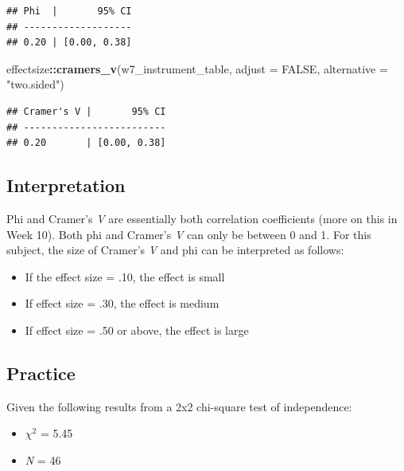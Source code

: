 \documentclass[
]{book}
\newenvironment{Shaded}{\begin{snugshade}}{\end{snugshade}}
\newcommand{\AttributeTok}[1]{\textcolor[rgb]{0.13,0.29,0.53}{#1}}
\newcommand{\ConstantTok}[1]{\textcolor[rgb]{0.56,0.35,0.01}{#1}}
\newcommand{\FunctionTok}[1]{\textcolor[rgb]{0.13,0.29,0.53}{\textbf{#1}}}
\newcommand{\NormalTok}[1]{#1}
\newcommand{\SpecialCharTok}[1]{\textcolor[rgb]{0.81,0.36,0.00}{\textbf{#1}}}
\newcommand{\StringTok}[1]{\textcolor[rgb]{0.31,0.60,0.02}{#1}}
\providecommand{\tightlist}{%
  \setlength{\itemsep}{0pt}\setlength{\parskip}{0pt}}
\begin{document}
\begin{verbatim}
## Phi  |       95% CI
## -------------------
## 0.20 | [0.00, 0.38]
\end{verbatim}

\begin{Shaded}
\begin{Highlighting}[]
\NormalTok{effectsize}\SpecialCharTok{::}\FunctionTok{cramers\_v}\NormalTok{(w7\_instrument\_table, }\AttributeTok{adjust =} \ConstantTok{FALSE}\NormalTok{, }\AttributeTok{alternative =} \StringTok{"two.sided"}\NormalTok{)}
\end{Highlighting}
\end{Shaded}

\begin{verbatim}
## Cramer's V |       95% CI
## -------------------------
## 0.20       | [0.00, 0.38]
\end{verbatim}

\hypertarget{interpretation}{%
\subsection{Interpretation}\label{interpretation}}

Phi and Cramer's \emph{V} are essentially both correlation coefficients (more on this in Week 10). Both phi and Cramer's \emph{V} can only be between 0 and 1. For this subject, the size of Cramer's \emph{V} and phi can be interpreted as follows:

\begin{itemize}
\tightlist
\item
  If the effect size = .10, the effect is small
\item
  If effect size = .30, the effect is medium
\item
  If effect size = .50 or above, the effect is large
\end{itemize}

\hypertarget{practice}{%
\subsection{Practice}\label{practice}}

Given the following results from a 2x2 chi-square test of independence:

\begin{itemize}
\tightlist
\item
  \(\chi^2\) = 5.45
\item
  \emph{N} = 46
\end{itemize}
\end{document}
